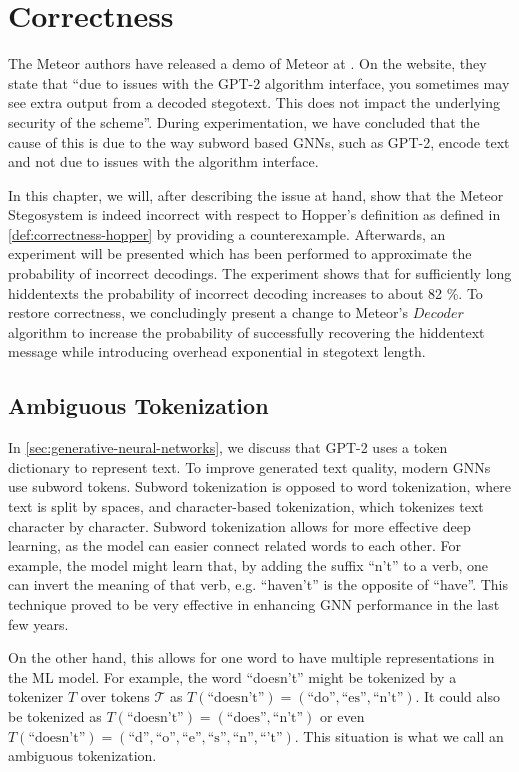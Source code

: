 \chapter{Correctness}
\label{chap:correctness}

The Meteor authors have released a demo of Meteor at \cite{MeteorDemo2021}. On the website, they state that ``due to issues with the GPT-2 algorithm interface, you sometimes may see extra output from a decoded stegotext. This does not impact the underlying security of the scheme''.
During experimentation,  we have concluded that the cause of this is due to the way subword based GNNs, such as GPT-2, encode text and not due to issues with the algorithm interface.

In this chapter, we will, after describing the issue at hand, show that the Meteor Stegosystem is indeed incorrect with respect to Hopper's definition as defined in \autoref{def:correctness-hopper} by providing a counterexample.
Afterwards, an experiment will be presented which has been performed to approximate the probability of incorrect decodings.
The experiment shows that for sufficiently long hiddentexts the probability of incorrect decoding increases to about 82 \%.
To restore correctness, we concludingly present a change to Meteor's $Decoder$ algorithm to increase the probability of successfully recovering the hiddentext message while introducing overhead exponential in stegotext length.

\section{Ambiguous Tokenization}

In \autoref{sec:generative-neural-networks}, we discuss that GPT-2 uses a token dictionary to represent text.
To improve generated text quality, modern GNNs use subword tokens.
Subword tokenization is opposed to word tokenization, where text is split by spaces, and character-based tokenization, which tokenizes text character by character.
Subword tokenization allows for more effective deep learning, as the model can easier connect related words to each other. 
For example, the model might learn that, by adding the suffix ``n't'' to a verb, one can invert the meaning of that verb, e.g. ``haven't'' is the opposite of ``have''.
This technique proved to be very effective in enhancing GNN performance in the last few years.

On the other hand, this allows for one word to have multiple representations in the ML model.
For example, the word ``doesn't'' might be tokenized by a tokenizer $T$ over tokens $\mathcal{T}$ as $T(\textrm{``doesn't''}) = ( \textrm{``do''}, \textrm{``es''}, \textrm{``n't''} )$.
It could also be tokenized as $T(\textrm{``doesn't''}) = ( \textrm{``does''}, \textrm{``n't''} )$ or even $T(\textrm{``doesn't''}) = ( \textrm{``d''}, \textrm{``o''}, \textrm{``e''}, \textrm{``s''}, \textrm{``n''}, \textrm{``'t''})$.
This situation is what we call an ambiguous tokenization.

